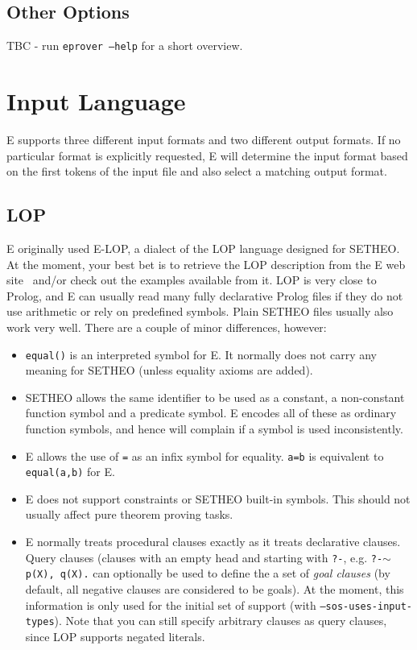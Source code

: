 \documentclass{report}
\begin{document}
\section{Other Options}
\label{sec:options:others}

TBC - run \texttt{eprover --help} for a short overview.


\chapter{Input Language}
\label{sec:language}

E supports three different input formats and two different output
formats. If no particular format is explicitly requested, E will
determine the input format based on the first tokens of the input file
and also select a  matching output format.

\section{LOP}

E originally used E-LOP, a dialect of the LOP language
designed for SETHEO. At the moment, your best bet is to
retrieve the LOP description from the E web site~\cite{E:WWW-04}
and/or check out the examples available from it.  LOP is very close to
Prolog, and E can usually read many fully declarative Prolog files if
they do not use arithmetic or rely on predefined symbols. Plain SETHEO
files usually also work very well.  There are a couple of minor
differences, however:

\begin{itemize}
\item \texttt{equal()} is an interpreted symbol for E. It normally
  does not carry any meaning for SETHEO (unless equality axioms are
  added).
\item SETHEO allows the same identifier to be used as a constant, a
  non-constant function symbol and a predicate symbol. E encodes all
  of these as ordinary function symbols, and hence will complain if a
  symbol is used inconsistently.
\item E allows the use of \texttt{=} as an infix symbol for
  equality. \texttt{a=b} is equivalent to \texttt{equal(a,b)} for E.
\item E does not support constraints or SETHEO built-in
  symbols. This should not usually affect pure theorem proving tasks.
\item E normally treats procedural clauses exactly as it treats
  declarative clauses. Query clauses (clauses with an empty head and
  starting with \texttt{?-}, e.g. \texttt{?-$\sim$p(X), q(X).} can
  optionally be used to define the a set of \emph{goal clauses} (by
  default, all negative clauses are considered to be goals). At the
  moment, this information is only used for the initial set of support
  (with \texttt{--sos-uses-input-types}). Note that you can still
  specify arbitrary clauses as query clauses, since LOP supports
  negated literals.
\end{itemize}
\end{document}

